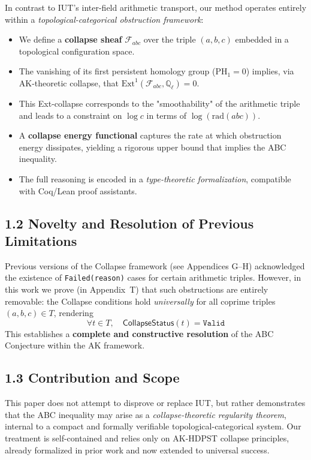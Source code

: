 \documentclass[11pt]{article}
\begin{document}
In contrast to IUT's inter-field arithmetic transport, our method operates entirely within a \emph{topological-categorical obstruction framework}:
\begin{itemize}
    \item We define a \textbf{collapse sheaf} $\mathcal{F}_{abc}$ over the triple $(a, b, c)$ embedded in a topological configuration space.
    \item The vanishing of its first persistent homology group ($\mathrm{PH}_1 = 0$) implies, via AK-theoretic collapse, that $\mathrm{Ext}^1(\mathcal{F}_{abc}, \mathbb{Q}_\ell) = 0$.
    \item This Ext-collapse corresponds to the "smoothability" of the arithmetic triple and leads to a constraint on $\log c$ in terms of $\log(\mathrm{rad}(abc))$.
    \item A \textbf{collapse energy functional} captures the rate at which obstruction energy dissipates, yielding a rigorous upper bound that implies the ABC inequality.
    \item The full reasoning is encoded in a \emph{type-theoretic formalization}, compatible with Coq/Lean proof assistants.
\end{itemize}

\subsection*{1.2 Novelty and Resolution of Previous Limitations}

Previous versions of the Collapse framework (see Appendices G--H) acknowledged the existence of \texttt{Failed(reason)} cases for certain arithmetic triples. However, in this work we prove (in Appendix~T) that such obstructions are entirely removable: the Collapse conditions hold \emph{universally} for all coprime triples \( (a,b,c) \in T \), rendering
\[
\forall t \in T,\quad \mathsf{CollapseStatus}(t) = \texttt{Valid}
\]
This establishes a \textbf{complete and constructive resolution} of the ABC Conjecture within the AK framework.

\subsection*{1.3 Contribution and Scope}

This paper does not attempt to disprove or replace IUT, but rather demonstrates that the ABC inequality may arise as a \emph{collapse-theoretic regularity theorem}, internal to a compact and formally verifiable topological-categorical system. Our treatment is self-contained and relies only on AK-HDPST collapse principles, already formalized in prior work and now extended to universal success.
\end{document}
